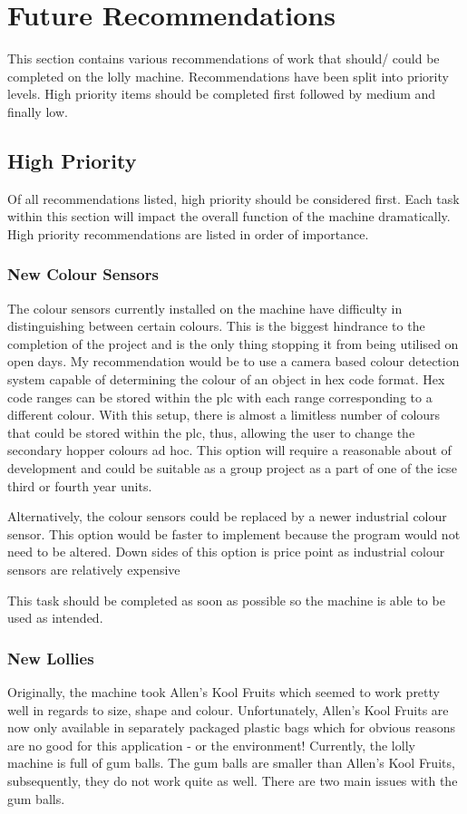  \section{Future Recommendations}
	This section contains various recommendations of work that should/ could be completed on the lolly machine. Recommendations have been split into priority levels. High priority items should be completed first followed by medium and finally low. 

    \subsection{High Priority}
    Of all recommendations listed, high priority should be considered first. Each task within this section will impact the overall function of the machine dramatically. High priority recommendations are listed in order of importance.
	
        \subsubsection{New Colour Sensors} 
		
            The colour sensors currently installed on the machine have difficulty in distinguishing between certain colours. This is the biggest hindrance to the completion of the project and is the only thing stopping it from being utilised on open days. My recommendation would be to use a camera based colour detection system capable of determining the colour of an object in hex code format. Hex code ranges can be stored within the \acrshort{plc} with each range corresponding to a different colour. With this setup, there is almost a limitless number of colours that could be stored within the \acrshort{plc}, thus, allowing the user to change the secondary hopper colours ad hoc. This option will require a reasonable about of development and could be suitable as a group project as a part of one of the \acrshort{icse} third or fourth year units.
			
			Alternatively, the colour sensors could be replaced by a newer industrial colour sensor. This option would be faster to implement because the program would not need to be altered. Down sides of this option is price point as industrial colour sensors are relatively expensive
			
			This task should be completed as soon as possible so the machine is able to be used as intended. 
			
       \subsubsection{New Lollies} 
            Originally, the machine took Allen's Kool Fruits which seemed to work pretty well in regards to size, shape and colour. Unfortunately, Allen's Kool Fruits are now only available in separately packaged plastic bags which for obvious reasons are no good for this application - or the environment! Currently, the lolly machine is full of gum balls. The gum balls are smaller than Allen's Kool Fruits, subsequently, they do not work quite as well. There are two main issues with the gum balls.
			
